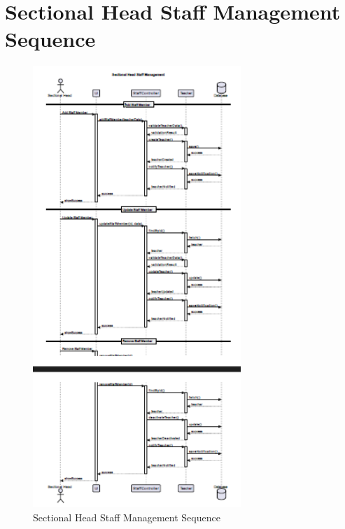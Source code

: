 \documentclass[12pt,a4paper]{report}
\begin{document}
\section{Sectional Head Staff Management Sequence}
\begin{figure}[htbp]
    \centering
    \includegraphics[width=0.7\textwidth]{sectional-head-staff-management-sequence.png}
    \caption{Sectional Head Staff Management Sequence}
    \label{fig:sectional-head-staff-management-sequence}
\end{figure}
\end{document}
